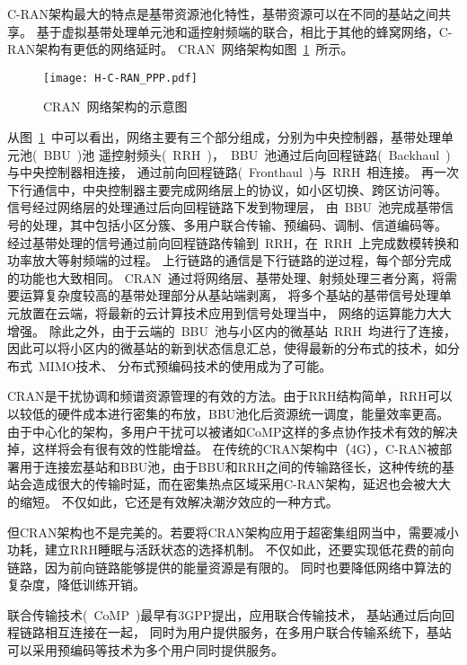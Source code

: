 C-RAN架构最大的特点是基带资源池化特性，基带资源可以在不同的基站之间共享。
基于虚拟基带处理单元池和遥控射频端的联合，相比于其他的蜂窝网络，C-RAN架构有更低的网络延时。
CRAN~网络架构如图~\ref{CRAN}~所示。
\begin{figure}[htbp]
\centering
\texttt{[image: H-C-RAN\_PPP.pdf]}
\caption{CRAN~网络架构的示意图}\vspace{-1.5em}
\label{CRAN}
\end{figure}
从图~\ref{CRAN}~中可以看出，网络主要有三个部分组成，分别为中央控制器，基带处理单元池(~BBU~)池
遥控射频头(~RRH~)，~BBU~池通过后向回程链路(~Backhaul~)与中央控制器相连接，
通过前向回程链路(~Fronthaul~)与~RRH~相连接。
再一次下行通信中，中央控制器主要完成网络层上的协议，如小区切换、跨区访问等。
信号经过网络层的处理通过后向回程链路下发到物理层，
由~BBU~池完成基带信号的处理，其中包括小区分簇、多用户联合传输、预编码、调制、信道编码等。
经过基带处理的信号通过前向回程链路传输到~RRH，在~RRH~上完成数模转换和功率放大等射频端的过程。
上行链路的通信是下行链路的逆过程，每个部分完成的功能也大致相同。
CRAN~通过将网络层、基带处理、射频处理三者分离，将需要运算复杂度较高的基带处理部分从基站端剥离，
将多个基站的基带信号处理单元放置在云端，将最新的云计算技术应用到信号处理当中，
网络的运算能力大大增强。
除此之外，由于云端的~BBU~池与小区内的微基站~RRH~均进行了连接，
因此可以将小区内的微基站的新到状态信息汇总，使得最新的分布式的技术，如分布式~MIMO技术、
分布式预编码技术的使用成为了可能。

CRAN是干扰协调和频谱资源管理的有效的方法。由于RRH结构简单，RRH可以以较低的硬件成本进行密集的布放，BBU池化后资源统一调度，能量效率更高。
由于中心化的架构，多用户干扰可以被诸如CoMP这样的多点协作技术有效的解决掉，这样将会有很有效的性能增益。
在传统的CRAN架构中（4G），C-RAN被部署用于连接宏基站和BBU池，由于BBU和RRH之间的传输路径长，这种传统的基站会造成很大的传输时延，而在密集热点区域采用C-RAN架构，延迟也会被大大的缩短。
不仅如此，它还是有效解决潮汐效应的一种方式。

但CRAN架构也不是完美的。若要将CRAN架构应用于超密集组网当中，需要减小功耗，建立RRH睡眠与活跃状态的选择机制。
不仅如此，还要实现低花费的前向链路，因为前向链路能够提供的能量资源是有限的。
同时也要降低网络中算法的复杂度，降低训练开销。


联合传输技术(~CoMP~)最早有3GPP提出，应用联合传输技术，
基站通过后向回程链路相互连接在一起，
同时为用户提供服务，在多用户联合传输系统下，基站可以采用预编码等技术为多个用户同时提供服务。

